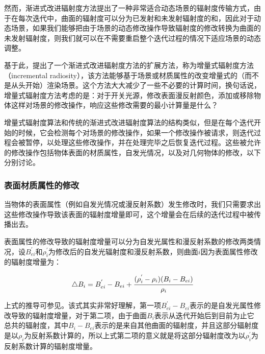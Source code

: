 然而，渐进式改进辐射度方法提出了一种非常适合动态场景的辐射度传输方式，由于在每次迭代中，曲面的辐射度可以分为已发射和未发射辐射度的和，因此对于动态场景，如果我们能够把由于场景的动态修改操作导致辐射度的修改转换为曲面的未发射辐射度，则我们就可以在不需要重启整个迭代过程的情况下适应场景的动态调整。

基于此，\cite{a:IncrementalRadiosity:AnExtensionofProgressiveRadiositytoanInteractiveImageSynthesisSystem}提出了一个渐进式改进辐射度方法的扩展方法，称为增量式辐射度方法（incremental radiosity），该方法能够基于场景或材质属性的改变增量式的（而不是从头开始）渲染场景。这个方法大大减少了一些不必要的计算时间，换句话说，增量式辐射度方法考虑的是：对于开关光源，修改表面漫反射颜色，添加或移除物体这样对场景的修改操作，响应这些修改需要的最小计算量是什么？

增量式辐射度算法和传统的渐进式改进辐射度算法的结构类似，但是在每个迭代开始的时候，它会检测每个对场景的修改操作，如果一个修改操作被请求，则迭代过程会被暂停，以处理这些修改操作，并在处理完毕之后恢复迭代过程。这些被允许的修改操作包括物体表面的材质属性，自发光情况，以及对几何物体的修改，以下分别讨论。




\subsubsection{表面材质属性的修改}
当物体的表面属性（例如自发光情况或漫反射系数）发生修改时，我们只需要求出这些修改操作导致该表面的辐射度增量即可，这个增量会在后续的迭代过程中被传播出去。

表面属性的修改导致的辐射度增量可以分为自发光属性和漫反射系数的修改两类情况，设$B^{'}_{ei}$和$\rho^{'}_i$为修改后的自发光辐射度和漫反射系数，则曲面$i$因为表面属性修改的辐射度增量为：

\begin{equation}
	\triangle B_i=B^{'}_{ei}-B_{ei}+ \cfrac{(\rho^{'}_i-\rho_i)(B_i-B_{ei})}{\rho_i}
\end{equation}

上式的推导可参见\cite{a:IncrementalRadiosity:AnExtensionofProgressiveRadiositytoanInteractiveImageSynthesisSystem,a:ImprovingInteractionWithRadiositybasedLightingSimulationPrograms}。该式其实非常好理解，第一项$B^{'}_{ei}-B_{ei}$表示的是自发光属性修改导致的辐射度增量，对于第二项，由于曲面$B_i$表示从迭代开始后到目前为止它总共的辐射度，其中$B_i-B_{ei}$表示的是来自其他曲面的辐射度，并且这部分辐射度是以$\rho_i$为反射系数计算的，所以上式第二项的意义就是将这部分辐射度改为以$\rho^{'}_i$为反射系数计算的辐射度增量。




